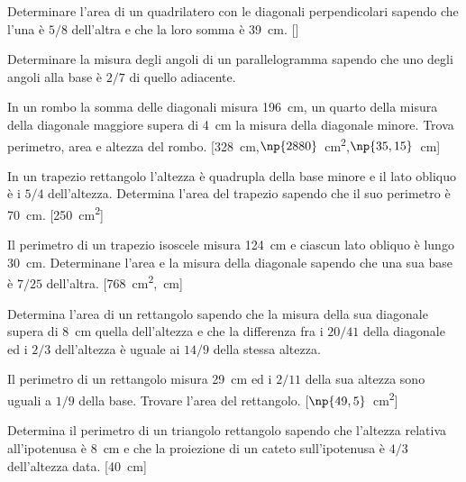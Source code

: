 \begin{multicols}{2}
\begin{esercizio}
\label{ese:7.59}
Determinare l'area di un quadrilatero con le diagonali perpendicolari 
sapendo che l'una è $5/8$ dell'altra e che la loro somma è 39~cm.
\hfill[]
\end{esercizio}

\begin{esercizio}
\label{ese:7.60}
Determinare la misura degli angoli di un parallelogramma sapendo che 
uno degli angoli alla base è $2/7$ di quello adiacente.
\end{esercizio}

\begin{esercizio}
\label{ese:7.64}
In un rombo la somma delle diagonali misura 196~cm, un quarto della 
misura della diagonale maggiore supera di 4~cm la misura della 
diagonale minore. Trova perimetro, area e altezza del rombo.
\hfill[328~cm,\quad $\np{2880}$~cm\textsuperscript{2},\quad $\np{35,15}$~cm]
\end{esercizio}

\begin{esercizio}
\label{ese:7.65}
In un trapezio rettangolo l'altezza è quadrupla della base minore e 
il lato obliquo è i $5/4$ dell'altezza. Determina l'area del trapezio 
sapendo che il suo perimetro è 70~cm.
\hfill[250~cm\textsuperscript{2}]
\end{esercizio}

\begin{esercizio}
\label{ese:7.66}
Il perimetro di un trapezio isoscele misura 124~cm e ciascun lato 
obliquo è lungo 30~cm. Determinane l'area e la misura della diagonale 
sapendo che una sua base è $7/25$ dell'altra.
\hfill[768~cm\textsuperscript{2},~cm]
\end{esercizio}

\begin{esercizio}
\label{ese:7.67}
Determina l'area di un rettangolo sapendo che la misura della sua 
diagonale supera di 8~cm quella dell'altezza e che la differenza fra 
i $20/41$ della diagonale ed i $2/3$ dell'altezza è uguale ai $14/9$ 
della stessa altezza.
\end{esercizio}

\begin{esercizio}
\label{ese:7.69}
Il perimetro di un rettangolo misura 29~cm ed i $2/11$ della sua 
altezza sono uguali a $1/9$ della base. Trovare l'area del rettangolo.
\hfill[$\np{49,5}$~cm\textsuperscript{2}]
\end{esercizio}

\begin{esercizio}
\label{ese:7.77}
Determina il perimetro di un triangolo rettangolo sapendo che 
l'altezza relativa all'ipotenusa è 8~cm e che la proiezione di un 
cateto sull'ipotenusa è $4/3$ dell'altezza data.
\hfill[40~cm]
\end{esercizio}


\end{multicols}

